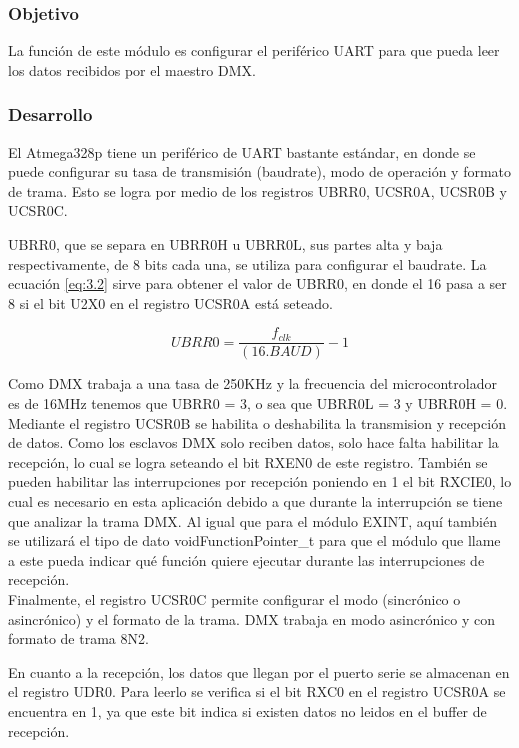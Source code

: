 \subsubsection{Objetivo}
La función de este módulo es configurar el periférico UART para que pueda leer los datos recibidos por el maestro DMX.

\subsubsection{Desarrollo}
El Atmega328p tiene un periférico de UART bastante estándar, en donde se puede configurar su tasa de transmisión (baudrate), modo de operación y formato de trama. Esto se logra por medio de los registros UBRR0, UCSR0A, UCSR0B y UCSR0C.

UBRR0, que se separa en UBRR0H u UBRR0L, sus partes alta y baja respectivamente, de 8 bits cada una, se utiliza para configurar el baudrate. La ecuación \ref{eq:3.2} sirve para obtener el valor de UBRR0, en donde el 16 pasa a ser 8 si el bit U2X0 en el registro UCSR0A está seteado.

\begin{equation} \label{eq:\theequation}
	UBRR0 = \frac{f_{clk}}{(16.BAUD)} - 1
\end{equation}

Como DMX trabaja a una tasa de 250KHz y la frecuencia del microcontrolador es de 16MHz tenemos que UBRR0 = 3, o sea que UBRR0L = 3 y UBRR0H = 0. \\
Mediante el registro UCSR0B se habilita o deshabilita la transmision y recepción de datos. Como los esclavos DMX solo reciben datos, solo hace falta habilitar la recepción, lo cual se logra seteando el bit RXEN0 de este registro. También se pueden habilitar las interrupciones por recepción poniendo en 1 el bit RXCIE0, lo cual es necesario en esta aplicación debido a que durante la interrupción se tiene que analizar la trama DMX. Al igual que para el módulo EXINT, aquí también se utilizará el tipo de dato voidFunctionPointer\_t para que el módulo que llame a este pueda indicar qué función quiere ejecutar durante las interrupciones de recepción.\\
Finalmente, el registro UCSR0C permite configurar el modo (sincrónico o asincrónico) y el formato de la trama. DMX trabaja en modo asincrónico y con formato de trama 8N2.

En cuanto a la recepción, los datos que llegan por el puerto serie se almacenan en el registro UDR0. Para leerlo se verifica si el bit RXC0 en el registro UCSR0A se encuentra en 1, ya que este bit indica si existen datos no leidos en el buffer de recepción.


